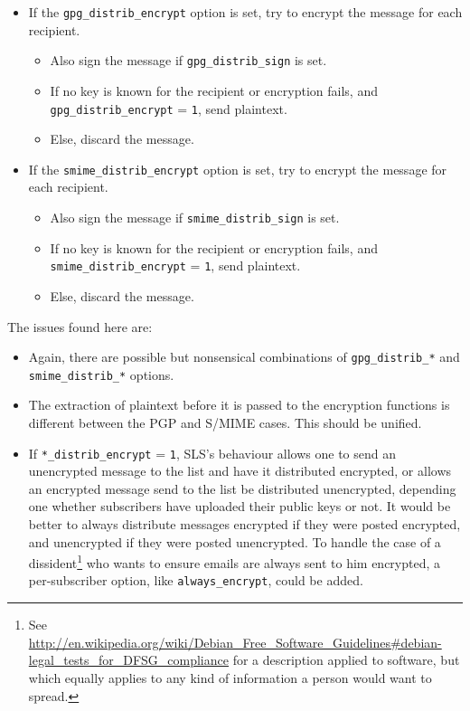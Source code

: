 \documentclass[a4]{article}
\newcommand{\var}[1]{\texttt{#1}}
\newcommand{\val}[1]{\texttt{#1}}
\begin{document}
\begin{itemize}
\item If the \var{gpg\_distrib\_encrypt} option is set, try to encrypt the message for each recipient.
  \begin{itemize}
  \item Also sign the message if \var{gpg\_distrib\_sign} is set.
  \item If no key is known for the recipient or encryption fails, and \var{gpg\_distrib\_encrypt} = \val{1}, send plaintext.
  \item Else, discard the message.
  \end{itemize}

\item If the \var{smime\_distrib\_encrypt} option is set, try to encrypt the message for each recipient.
  \begin{itemize}
  \item Also sign the message if \var{smime\_distrib\_sign} is set.
  \item If no key is known for the recipient or encryption fails, and \var{smime\_distrib\_encrypt} = \val{1}, send plaintext.
  \item Else, discard the message.
  \end{itemize}
\end{itemize}

The issues found here are:
\begin{itemize}
\item Again, there are possible but nonsensical combinations of \var{gpg\_distrib\_*} and \var{smime\_distrib\_*} options.
\item The extraction of plaintext before it is passed to the encryption functions is different between the PGP and S/MIME cases.
This should be unified.
\item If \var{*\_distrib\_encrypt} = \val{1},
SLS's behaviour allows one to send an unencrypted message to the list and have it distributed encrypted,
or allows an encrypted message send to the list be distributed unencrypted,
depending one whether subscribers have uploaded their public keys or not.
It would be better to always distribute messages encrypted if they were posted encrypted,
and unencrypted if they were posted unencrypted.
To handle the case of a
dissident\footnote{See \url{http://en.wikipedia.org/wiki/Debian_Free_Software_Guidelines\#debian-legal_tests_for_DFSG_compliance}
for a description applied to software,
but which equally applies to any kind of information a person would want to spread.}
 who wants to ensure emails are always sent to him encrypted,
a per-subscriber option, like \var{always\_encrypt}, could be added.
\end{itemize}
\end{document}
